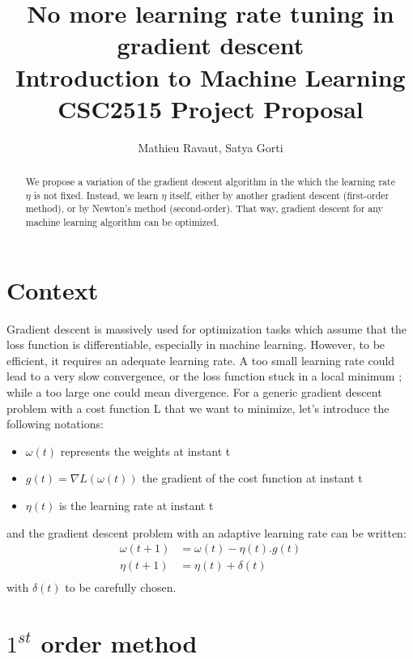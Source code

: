 \documentclass[]{article}
\title{No more learning rate tuning in gradient descent \\
\small{Introduction to Machine Learning CSC2515 Project Proposal}}
\author{Mathieu Ravaut, Satya Gorti}
\begin{document}
\maketitle

\begin{abstract}
	
We propose a variation of the gradient descent algorithm in the which the learning rate $\eta$ is not fixed. Instead, we learn $\eta$ itself, either by another gradient descent (first-order method), or by Newton's method (second-order). That way, gradient descent for any machine learning algorithm can be optimized. 

\end{abstract}

\section{Context}

Gradient descent is massively used for optimization tasks which assume that the loss function is differentiable, especially in machine learning. However, to be efficient, it requires an adequate learning rate. A too small learning rate could lead to a very slow convergence, or the loss function stuck in a local minimum ; while a too large one could mean divergence. For a generic gradient descent problem with a cost function L that we want to minimize, let's introduce the following notations:\\
\begin{itemize}
\item $\omega(t)$ represents the weights at instant t
\item $g(t) = \nabla L(\omega(t))$ the gradient of the cost function at instant t
\item $\eta(t)$ is the learning rate at instant t
\end{itemize}
and the gradient descent problem with an adaptive learning rate can be written:\\
\begin{align}
\omega(t+1) &= \omega(t) - \eta(t).g(t)\\
\eta(t+1) &= \eta(t) + \delta(t)\\
\end{align}
with $\delta(t)$ to be carefully chosen. 

\newpage
\section{$1^{st}$ order method}
\end{document}
